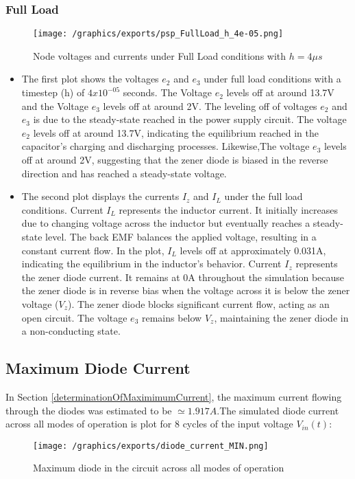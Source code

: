 \subsubsection{Full Load}
\begin{figure}[H]
    \centering
    \texttt{[image: /graphics/exports/psp\_FullLoad\_h\_4e-05.png]}
    \caption{Node voltages and currents under Full Load conditions with $h=4\mu s$}
\end{figure}
\begin{itemize}
	\item The first plot shows the voltages $e_2$ and $e_3$ under full load conditions with a timestep (h) of $4x10^{-05}$ seconds. The Voltage $e_2$ levels off at around 13.7V and the Voltage $e_3$ levels off at around 2V. The leveling off of voltages $e_2$ and $e_3$ is due to the steady-state reached in the power supply circuit. The voltage $e_2$ levels off at around 13.7V, indicating the equilibrium reached in the capacitor's charging and discharging processes. Likewise,The voltage $e_3$ levels off at around 2V, suggesting that the zener diode is biased in the reverse direction and has reached a steady-state voltage.
    \item The second plot displays the currents $I_z$ and $I_L$ under the full load conditions. Current $I_L$ represents the inductor current. It initially increases due to changing voltage across the inductor but eventually reaches a steady-state level. The back EMF balances the applied voltage, resulting in a constant current flow. In the plot, $I_L$ levels off at approximately 0.031A, indicating the equilibrium in the inductor's behavior. Current $I_z$ represents the zener diode current. It remains at 0A throughout the simulation because the zener diode is in reverse bias when the voltage across it is below the zener voltage ($V_z$). The zener diode blocks significant current flow, acting as an open circuit. The voltage $e_3$ remains below $V_z$, maintaining the zener diode in a non-conducting state.

    
\end{itemize}

\pagebreak
\subsection{Maximum Diode Current}
In Section \ref{determinationOfMaximimumCurrent}, the maximum current flowing through the diodes was estimated to be $\simeq 1.917A$.The simulated diode current across all modes of operation is plot for 8 cycles of the input voltage $V_{in}(t)$:
\begin{figure}[H]
	\centering
	\texttt{[image: /graphics/exports/diode\_current\_MIN.png]}
	\caption{Maximum diode in the circuit across all modes of operation}
\end{figure}

